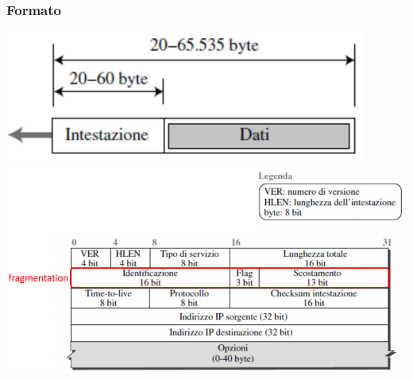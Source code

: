 \documentclass[10pt]{article}
\begin{document}
\subsubsection{Formato}
\begin{center}
\includegraphics[scale=1]{ipdatagramscheme.png}\\
\includegraphics[scale=0.7]{ipdatagramformat.png}
\end{center}
\pagebreak
\end{document}
